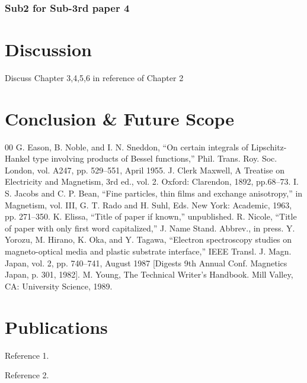 \documentclass[12pt,a4paper]{report}
\begin{document}
\subsection{Sub2  for Sub-3rd paper 4}
\chapter{Discussion}
\noindent{\rule{\textwidth}{1.5pt}}
Discuss Chapter 3,4,5,6 in reference of Chapter 2
\chapter{Conclusion \& Future Scope}
\noindent{\rule{\textwidth}{1.5pt}}

\begin{thebibliography}{00}
	 G. Eason, B. Noble, and I. N. Sneddon, ``On certain integrals of Lipschitz-Hankel type involving products of Bessel functions,'' Phil. Trans. Roy. Soc. London, vol. A247, pp. 529--551, April 1955.
	 J. Clerk Maxwell, A Treatise on Electricity and Magnetism, 3rd ed., vol. 2. Oxford: Clarendon, 1892, pp.68--73.
	 I. S. Jacobs and C. P. Bean, ``Fine particles, thin films and exchange anisotropy,'' in Magnetism, vol. III, G. T. Rado and H. Suhl, Eds. New York: Academic, 1963, pp. 271--350.
	 K. Elissa, ``Title of paper if known,'' unpublished.
	 R. Nicole, ``Title of paper with only first word capitalized,'' J. Name Stand. Abbrev., in press.
	 Y. Yorozu, M. Hirano, K. Oka, and Y. Tagawa, ``Electron spectroscopy studies on magneto-optical media and plastic substrate interface,'' IEEE Transl. J. Magn. Japan, vol. 2, pp. 740--741, August 1987 [Digests 9th Annual Conf. Magnetics Japan, p. 301, 1982].
	 M. Young, The Technical Writer's Handbook. Mill Valley, CA: University Science, 1989.
\end{thebibliography}
\chapter*{Publications}
\begin{enumerate}[{[1]}]
	\item Reference 1.
	\item Reference 2.
\end{enumerate}
\end{document}
